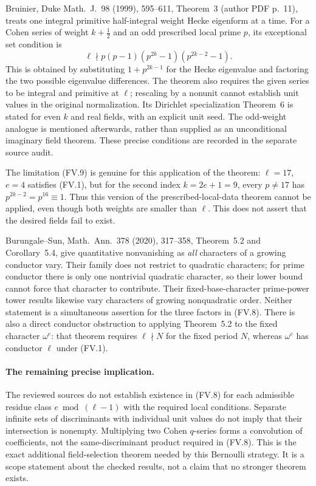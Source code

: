 Bruinier, Duke Math.~J.~98 (1999), 595--611, Theorem~3
(author PDF p.~11), treats one integral primitive half-integral
weight Hecke eigenform at a time.  For a Cohen series of weight
$k+\tfrac12$ and an odd prescribed local prime $p$, its exceptional
set condition is
\[
 \ell\nmid p(p-1)(p^{2k}-1)(p^{2k-2}-1).                    \tag{FV.9}
\]
This is obtained by substituting $1+p^{2k-1}$ for the Hecke
eigenvalue and factoring the two possible eigenvalue differences.
The theorem also requires the given series to be integral and
primitive at $\ell$; rescaling by a nonunit cannot establish
unit values in the original normalization.  Its Dirichlet
specialization Theorem~6 is stated for even $k$ and real fields,
with an explicit unit seed.  The odd-weight analogue is mentioned
afterwards, rather than supplied as an unconditional imaginary
field theorem.  These precise conditions are recorded in the
separate source audit.

The limitation (FV.9) is genuine for this application of the
theorem: $\ell=17$, $e=4$ satisfies (FV.1), but for the second
index $k=2e+1=9$, every $p\ne17$ has $p^{2k-2}=p^{16}\equiv1$.
Thus this version of the prescribed-local-data theorem cannot
be applied, even though both weights are smaller than $\ell$.
This does not assert that the desired fields fail to exist.

Burungale--Sun, Math.~Ann.~378 (2020), 317--358,
Theorem~5.2 and Corollary~5.4, give quantitative nonvanishing as
\emph{all} characters of a growing conductor vary.  Their family
does not restrict to quadratic characters; for prime conductor
there is only one nontrivial quadratic character, so their lower
bound cannot force that character to contribute.  Their
fixed-base-character prime-power tower results likewise vary
characters of growing nonquadratic order.  Neither statement is
a simultaneous assertion for the three factors in (FV.8).
There is also a direct conductor obstruction to applying
Theorem~5.2 to the fixed character $\omega^e$: that theorem
requires $\ell\nmid N$ for the fixed period $N$, whereas
$\omega^e$ has conductor $\ell$ under (FV.1).

\paragraph{The remaining precise implication.}
The reviewed sources do not establish existence in (FV.8) for
each admissible residue class $e\bmod(\ell-1)$ with the required
local conditions.  Separate infinite sets of discriminants with
individual unit values do not imply that their intersection is
nonempty.  Multiplying two Cohen $q$-series forms a convolution
of coefficients, not the same-discriminant product required in
(FV.8).  This is the exact additional field-selection theorem
needed by this Bernoulli strategy.  It is a scope statement about
the checked results, not a claim that no stronger theorem exists.

